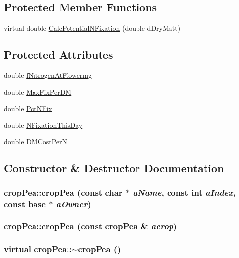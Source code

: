 \subsection*{Protected Member Functions}
\begin{DoxyCompactItemize}
\item 
virtual double \hyperlink{classcrop_pea_a926468b50eb7ba88b6e3c9641377ae10}{CalcPotentialNFixation} (double dDryMatt)
\end{DoxyCompactItemize}
\subsection*{Protected Attributes}
\begin{DoxyCompactItemize}
\item 
double \hyperlink{classcrop_pea_a95d25dcf7dfa14e114de67a0029eab02}{fNitrogenAtFlowering}
\item 
double \hyperlink{classcrop_pea_a1852a7eb6965220c3bbd686504a87193}{MaxFixPerDM}
\item 
double \hyperlink{classcrop_pea_ad48e8faf29f08617f2206c2577af11ac}{PotNFix}
\item 
double \hyperlink{classcrop_pea_a0b2798f6476655b22c242207b3fb0d0f}{NFixationThisDay}
\item 
double \hyperlink{classcrop_pea_a74e2cc41cbccf0a208430b23a1267853}{DMCostPerN}
\end{DoxyCompactItemize}


\subsection{Constructor \& Destructor Documentation}
\hypertarget{classcrop_pea_a99687d96732363431a8f6bc474ac1773}{
\subsubsection[{cropPea}]{\setlength{\rightskip}{0pt plus 5cm}cropPea::cropPea (const char $\ast$ {\em aName}, \/  const int {\em aIndex}, \/  const {\bf base} $\ast$ {\em aOwner})}}
\label{classcrop_pea_a99687d96732363431a8f6bc474ac1773}
\hypertarget{classcrop_pea_a00017b07f1e047f3af5e170497298180}{
\subsubsection[{cropPea}]{\setlength{\rightskip}{0pt plus 5cm}cropPea::cropPea (const {\bf cropPea} \& {\em acrop})}}
\label{classcrop_pea_a00017b07f1e047f3af5e170497298180}
\hypertarget{classcrop_pea_aec7823ced622eb52b0de4e637ab03edd}{
\subsubsection[{$\sim$cropPea}]{\setlength{\rightskip}{0pt plus 5cm}virtual cropPea::$\sim$cropPea ()}}
\label{classcrop_pea_aec7823ced622eb52b0de4e637ab03edd}


